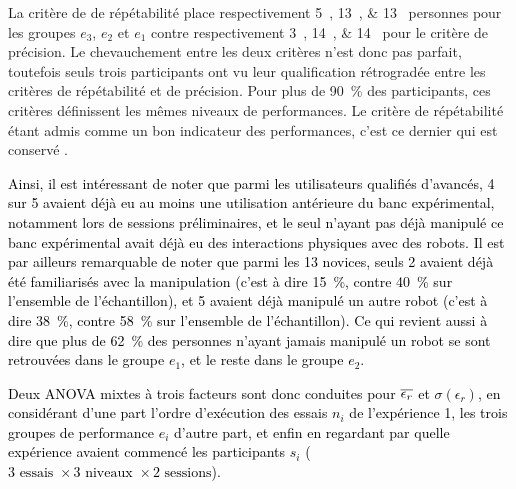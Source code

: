 

La critère de de répétabilité place respectivement \SIlist{5;13;13}{} personnes pour les groupes $e_3$, $e_2$ et $e_1$ contre respectivement \SIlist{3;14;14}{} pour le critère de précision. Le chevauchement entre les deux critères n'est donc pas parfait, toutefois seuls trois participants ont vu leur qualification rétrogradée entre les critères de répétabilité et de précision. Pour plus de \SI{90}{\percent} des participants, ces critères définissent les mêmes niveaux de performances. %
Le critère de répétabilité étant admis comme un bon indicateur des performances, c'est ce dernier qui est conservé \parencite{wei_stability_2008}.

\textcolor{black}{Ainsi, il est intéressant de noter que parmi les utilisateurs qualifiés d'avancés, 4 sur 5 avaient déjà eu au moins une utilisation antérieure du banc expérimental, notamment lors de sessions préliminaires, et le seul n'ayant pas déjà manipulé ce banc expérimental avait déjà eu des interactions physiques avec des robots. Il est par ailleurs remarquable de noter que parmi les 13 novices, seuls 2 avaient déjà été familiarisés avec la manipulation (c'est à dire \SI{15}{\percent}, contre \SI{40}{\percent} sur l'ensemble de l'échantillon), et 5 avaient déjà manipulé un autre robot (c'est à dire \SI{38}{\percent}, contre \SI{58}{\percent} sur l'ensemble de l'échantillon). Ce qui revient aussi à dire que plus de \SI{62}{\percent} des personnes n'ayant jamais manipulé un robot se sont retrouvées dans le groupe $e_1$, et le reste dans le groupe $e_2$.}

\textcolor{black}{Deux ANOVA mixtes à trois facteurs sont donc conduites pour $\overline{\epsilon_r}$ et $\sigma(\epsilon_r)$, en considérant d'une part l'ordre d'exécution des essais $n_i$ de l'expérience 1, les trois groupes de performance $e_i$ d'autre part, et enfin en regardant par quelle expérience avaient commencé les participants $s_i$ ($3\text{ essais } \times 3\text{ niveaux }\times 2\text{ sessions}$).}


